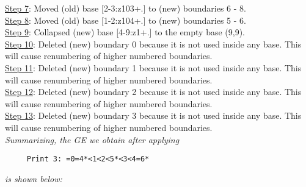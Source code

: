 \documentclass[final]{article}
\begin{document}
{\underline{Step 7}:} Moved (old) base [2-3:z103+.]  to (new) boundaries 6 - 8.\\
{\underline{Step 8}:} Moved (old) base [1-2:z104+.]  to (new) boundaries 5 - 6.\\
{\underline{Step 9}:} Collapsed (new) base [4-9:z1+.]  to the empty base (9,9).
\\
{\underline{Step 10}:} Deleted (new) boundary 0 because it is not used inside any base.  This will cause renumbering of higher numbered boundaries.
\\
{\underline{Step 11}:} Deleted (new) boundary 1 because it is not used inside any base.  This will cause renumbering of higher numbered boundaries.
\\
{\underline{Step 12}:} Deleted (new) boundary 2 because it is not used inside any base.  This will cause renumbering of higher numbered boundaries.
\\
{\underline{Step 13}:} Deleted (new) boundary 3 because it is not used inside any base.  This will cause renumbering of higher numbered boundaries.
\\[0.1in]
{\em Summarizing, the GE we obtain after applying}
\begin{verbatim}
     Print 3: =0=4*<1<2<5*<3<4=6*
\end{verbatim}
{\em is shown below:}
\end{document}
